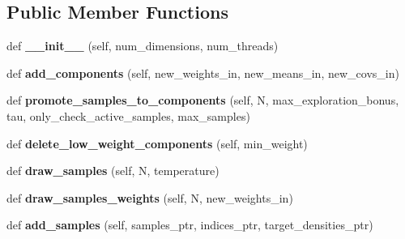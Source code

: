 \subsection*{Public Member Functions}
\begin{DoxyCompactItemize}
\item 
def {\bfseries \+\_\+\+\_\+init\+\_\+\+\_\+} (self, num\+\_\+dimensions, num\+\_\+threads)\hypertarget{classVIPS__PythonWrapper_1_1VIPS__PythonWrapper_a9341696236fd64ec54fae41e0fb14c5e}{}\label{classVIPS__PythonWrapper_1_1VIPS__PythonWrapper_a9341696236fd64ec54fae41e0fb14c5e}

\item 
def {\bfseries add\+\_\+components} (self, new\+\_\+weights\+\_\+in, new\+\_\+means\+\_\+in, new\+\_\+covs\+\_\+in)\hypertarget{classVIPS__PythonWrapper_1_1VIPS__PythonWrapper_a2e83abd123df46605bf9f509482ba6aa}{}\label{classVIPS__PythonWrapper_1_1VIPS__PythonWrapper_a2e83abd123df46605bf9f509482ba6aa}

\item 
def {\bfseries promote\+\_\+samples\+\_\+to\+\_\+components} (self, N, max\+\_\+exploration\+\_\+bonus, tau, only\+\_\+check\+\_\+active\+\_\+samples, max\+\_\+samples)\hypertarget{classVIPS__PythonWrapper_1_1VIPS__PythonWrapper_adf3bfe2bd7c08eb16161b980185c48b4}{}\label{classVIPS__PythonWrapper_1_1VIPS__PythonWrapper_adf3bfe2bd7c08eb16161b980185c48b4}

\item 
def {\bfseries delete\+\_\+low\+\_\+weight\+\_\+components} (self, min\+\_\+weight)\hypertarget{classVIPS__PythonWrapper_1_1VIPS__PythonWrapper_a3608b22c3a3c6ee0e79054d034ef3ba5}{}\label{classVIPS__PythonWrapper_1_1VIPS__PythonWrapper_a3608b22c3a3c6ee0e79054d034ef3ba5}

\item 
def {\bfseries draw\+\_\+samples} (self, N, temperature)\hypertarget{classVIPS__PythonWrapper_1_1VIPS__PythonWrapper_accf6844547cc58211f290b9179137751}{}\label{classVIPS__PythonWrapper_1_1VIPS__PythonWrapper_accf6844547cc58211f290b9179137751}

\item 
def {\bfseries draw\+\_\+samples\+\_\+weights} (self, N, new\+\_\+weights\+\_\+in)\hypertarget{classVIPS__PythonWrapper_1_1VIPS__PythonWrapper_ab50ef56f6c26d4c9affffdcc098d7bb2}{}\label{classVIPS__PythonWrapper_1_1VIPS__PythonWrapper_ab50ef56f6c26d4c9affffdcc098d7bb2}

\item 
def {\bfseries add\+\_\+samples} (self, samples\+\_\+ptr, indices\+\_\+ptr, target\+\_\+densities\+\_\+ptr)\hypertarget{classVIPS__PythonWrapper_1_1VIPS__PythonWrapper_a23823478d0783aa449e3cd1d0df226ae}{}\label{classVIPS__PythonWrapper_1_1VIPS__PythonWrapper_a23823478d0783aa449e3cd1d0df226ae}


\end{DoxyCompactItemize}
